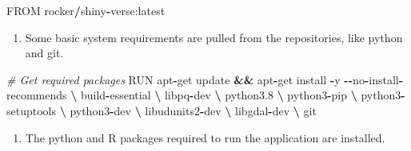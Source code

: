 \documentclass[
  a4paper]{article}
\newenvironment{Shaded}{\begin{snugshade}}{\end{snugshade}}
\newcommand{\CommentTok}[1]{\textcolor[rgb]{0.56,0.35,0.01}{\textit{#1}}}
\newcommand{\FloatTok}[1]{\textcolor[rgb]{0.00,0.00,0.81}{#1}}
\newcommand{\NormalTok}[1]{#1}
\newcommand{\OperatorTok}[1]{\textcolor[rgb]{0.81,0.36,0.00}{\textbf{#1}}}
\providecommand{\tightlist}{%
  \setlength{\itemsep}{0pt}\setlength{\parskip}{0pt}}
\begin{document}
\begin{Shaded}
\begin{Highlighting}[]
\NormalTok{FROM rocker}\OperatorTok{/}\NormalTok{shiny}\OperatorTok{{-}}\NormalTok{verse:latest}
\end{Highlighting}
\end{Shaded}

\normalsize

\begin{enumerate}
\def\labelenumi{\arabic{enumi}.}
\setcounter{enumi}{1}
\tightlist
\item
  Some basic system requirements are pulled from the repositories, like
  python and git.
\end{enumerate}

\footnotesize

\begin{Shaded}
\begin{Highlighting}[]
\CommentTok{\# Get required packages}
\NormalTok{RUN apt}\OperatorTok{{-}}\NormalTok{get update }\OperatorTok{\&\&}\NormalTok{ apt}\OperatorTok{{-}}\NormalTok{get install }\OperatorTok{{-}}\NormalTok{y }\OperatorTok{{-}{-}}\NormalTok{no}\OperatorTok{{-}}\NormalTok{install}\OperatorTok{{-}}\NormalTok{recommends }\OperatorTok{\textbackslash{}}
\NormalTok{    build}\OperatorTok{{-}}\NormalTok{essential }\OperatorTok{\textbackslash{}}
\NormalTok{    libpq}\OperatorTok{{-}}\NormalTok{dev }\OperatorTok{\textbackslash{}}
\NormalTok{    python3}\FloatTok{.8} \OperatorTok{\textbackslash{}}
\NormalTok{    python3}\OperatorTok{{-}}\NormalTok{pip }\OperatorTok{\textbackslash{}}
\NormalTok{    python3}\OperatorTok{{-}}\NormalTok{setuptools }\OperatorTok{\textbackslash{}}
\NormalTok{    python3}\OperatorTok{{-}}\NormalTok{dev }\OperatorTok{\textbackslash{}}
\NormalTok{    libudunits2}\OperatorTok{{-}}\NormalTok{dev }\OperatorTok{\textbackslash{}}
\NormalTok{    libgdal}\OperatorTok{{-}}\NormalTok{dev }\OperatorTok{\textbackslash{}}
\NormalTok{    git}
\end{Highlighting}
\end{Shaded}

\normalsize

\begin{enumerate}
\def\labelenumi{\arabic{enumi}.}
\setcounter{enumi}{2}
\tightlist
\item
  The python and R packages required to run the application are
  installed.
\end{enumerate}

\footnotesize
\end{document}
